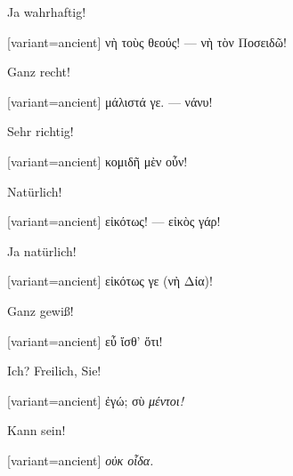 Ja wahrhaftig! 

\switchcolumn

\begin{greek}[variant=ancient]%
νὴ τοὺς θεούς! --- νὴ τὸν Ποσειδῶ!

\end{greek}%
\switchcolumn*

Ganz recht! 

\switchcolumn

\begin{greek}[variant=ancient]%
μάλιστά γε. --- νάνυ!

\end{greek}%
\switchcolumn*

Sehr richtig! 

\switchcolumn

\begin{greek}[variant=ancient]%
κομιδῆ μὲν οὖν!

\end{greek}%
\switchcolumn*

Natürlich! 

\switchcolumn

\begin{greek}[variant=ancient]%
εἰκότως! --- εἰκὸς γάρ!

\end{greek}%
\switchcolumn*

Ja natürlich! 

\switchcolumn

\begin{greek}[variant=ancient]%
εἰκότως γε (νὴ Δία)!

\end{greek}%
\switchcolumn*

Ganz gewiß! 

\switchcolumn

\begin{greek}[variant=ancient]%
εὖ ἴσθ' ὅτι!

\end{greek}%
\switchcolumn*

Ich? Freilich, Sie! 

\switchcolumn

\begin{greek}[variant=ancient]%
ἐγώ; σὺ \emph{μέντοι!}

\end{greek}%
\switchcolumn*

Kann sein! 

\switchcolumn

\begin{greek}[variant=ancient]%
\emph{οὐκ οἶδα.}

\end{greek}%
\switchcolumn*

